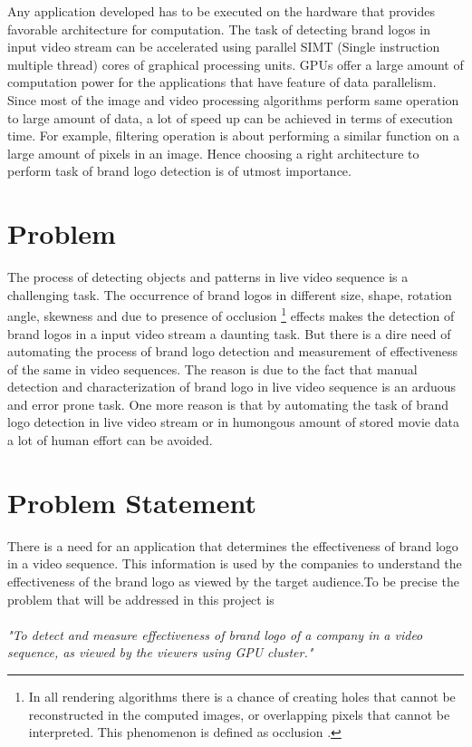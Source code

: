 Any application developed has to be executed on the hardware that provides favorable architecture for computation. The task of detecting brand logos in input video stream can be accelerated using parallel SIMT (Single instruction multiple thread) cores of graphical processing units. GPUs offer a large amount of computation power for the applications that have feature of data parallelism. Since most of the image and video processing algorithms perform same operation to large amount of data, a lot of speed up can be achieved in terms of execution time. For example, filtering operation is about performing a similar function on a large amount of pixels in an image. Hence choosing a right architecture to perform task of brand logo detection is of utmost importance.        

\section{Problem}
The process of detecting objects and patterns in live video sequence is a challenging task. The occurrence of brand logos in different size, shape, rotation angle, skewness and due to presence of occlusion \footnote{In all rendering algorithms there is a chance of creating holes that cannot be reconstructed in the computed images, or overlapping pixels that cannot be interpreted. This phenomenon is defined as occlusion \cite{Depth6:online}.} effects makes the detection of brand logos in a input video stream a daunting task. But there is a dire need of automating the process of brand logo detection and measurement of effectiveness of the same in video sequences. The reason is due to the fact that manual detection and characterization of brand logo in live video sequence is an arduous and error prone task. One more reason is that by automating the task of brand logo detection in live video stream or in humongous amount of stored movie data a lot of human effort can be avoided.  


\section{Problem Statement}
There is a need for an application that determines the effectiveness of brand logo in a video sequence. This information is used by the companies to understand the effectiveness of the brand logo as viewed by the target audience.To be precise the problem that will be addressed in this project is \\ \\ 
{\it "To detect and measure effectiveness of brand logo of a company in a video sequence, as viewed by the viewers using GPU cluster."} 

